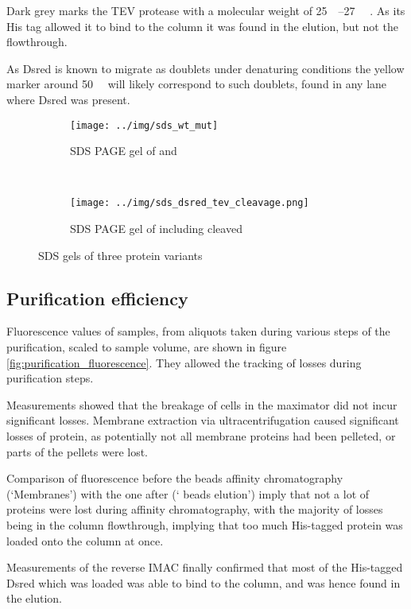 Dark grey marks the TEV protease with a molecular weight of
\SIrange{25}{27}{\kilo\Da} \cite{pdb}. As its His tag allowed it to bind to the
column it was found in the elution, but not the flowthrough.

As Dsred is known to migrate as doublets under denaturing
conditions\cite{sacchetti2002} the yellow marker around \SI{50}{\kilo\Da} will
likely correspond to such doublets, found in any lane where Dsred was present.

\begin{figure*}
    \centering
    \begin{subfigure}{0.45\textwidth}
        \texttt{[image: ../img/sds\_wt\_mut]}
	\caption{SDS PAGE gel of \hs{} and \hsmut{}}
        \label{fig:sds_wt_mut}
    \end{subfigure}
    ~
    \begin{subfigure}{0.45\textwidth}
        \texttt{[image: ../img/sds\_dsred\_tev\_cleavage.png]}
	\caption{SDS PAGE gel of \hsdsred{} including cleaved \hsdsred{}}
        \label{fig:sds_dsred_cleaved}
    \end{subfigure}
    \caption{SDS gels of three protein variants}
    \label{fig:sds}
\end{figure*}

\subsection{Purification efficiency}

Fluorescence values of \hsdsred{} samples, from aliquots taken during various
steps of the purification, scaled to sample volume, are shown in figure
\ref{fig:purification_fluorescence}. They allowed the tracking of losses during
purification steps.

Measurements showed that the breakage of cells in the maximator did not incur
significant losses. Membrane extraction via ultracentrifugation caused
significant losses of protein, as potentially not all membrane proteins had
been pelleted, or parts of the pellets were lost.

Comparison of fluorescence before the  beads affinity chromatography
(`Membranes') with the one after (` beads elution') imply that not a lot
of proteins were lost during affinity chromatography, with the majority of
losses being in the column flowthrough, implying that too much His-tagged
protein was loaded onto the column at once.

Measurements of the reverse IMAC finally confirmed that most of the His-tagged
Dsred which was loaded was able to bind to the column, and was hence found in
the elution.

